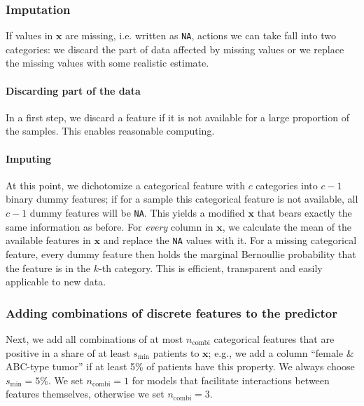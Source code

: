\subsubsection{Imputation}

If values in $\mathbf{x}$ are missing, i.e. written as \texttt{NA}, actions we can take fall into two 
categories: we discard the part of data affected by missing values or we replace the missing values 
with some realistic estimate.

\paragraph{Discarding part of the data}

In a first step, we discard a feature if it is not available for a large proportion of the samples.
This enables reasonable computing.

\paragraph{Imputing}

At this point, we dichotomize a categorical 
feature with $c$ categories into $c-1$ binary dummy features; if for a sample this categorical feature is not 
available, all $c-1$ dummy features will be \texttt{NA}. This yields a modified $\mathbf{x}$ that 
bears exactly the same information as before. For \textit{every} column in $\mathbf{x}$, we calculate the 
mean of the available features in $\mathbf{x}$ and replace the \texttt{NA} values with it. 
For a missing categorical feature, every dummy feature then holds the marginal Bernoullie 
probability that the feature is in the $k$-th category. This is efficient, transparent and easily 
applicable to new data.

\subsubsection{Adding combinations of discrete features to the predictor}

Next, we add all combinations of at most $n_\text{combi}$ categorical features that are positive in a 
share of at least $s_\text{min}$ patients to $\mathbf{x}$; e.g., we add a column ``female \& ABC-type 
tumor'' if at least \num{5}\% of patients have this property. We always choose $s_\text{min}
= 5\%$. We set $n_\text{combi} = 1$ for models that facilitate interactions between features 
themselves, otherwise we set $n_\text{combi} = 3$.


